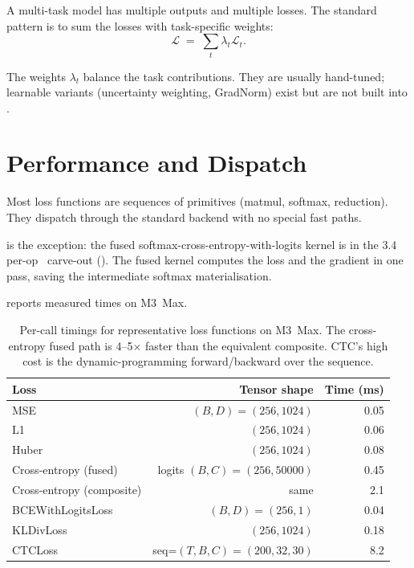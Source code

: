 A multi-task model has multiple outputs and multiple losses.
The standard pattern is to sum the losses with task-specific
weights:
\[
\mathcal{L} \;=\; \sum_t \lambda_t \mathcal{L}_t.
\]

The weights $\lambda_t$ balance the task contributions. They are
usually hand-tuned; learnable variants (uncertainty weighting,
GradNorm) exist but are not built into \Lucid.

\section{Performance and Dispatch}
\label{sec:losses:perf}

Most loss functions are sequences of primitives (matmul, softmax,
reduction). They dispatch through the standard backend with no
special fast paths.

 is the exception: the fused
softmax-cross-entropy-with-logits kernel is in the 3.4 per-op
\MPSGraph\ carve-out
(). The fused kernel computes the
loss and the gradient in one pass, saving the intermediate
softmax materialisation.

 reports measured times on M3~Max.

\begin{table}[t]
\centering
\small
\begin{tabular}{lrr}
\toprule
Loss & Tensor shape & Time (ms) \\
\midrule
MSE                       & $(B, D) = (256, 1024)$ & 0.05 \\
L1                        & $(256, 1024)$          & 0.06 \\
Huber                     & $(256, 1024)$          & 0.08 \\
Cross-entropy (fused)     & logits $(B, C) = (256, 50000)$ & 0.45 \\
Cross-entropy (composite) & same                     & 2.1  \\
BCEWithLogitsLoss         & $(B, D) = (256, 1)$    & 0.04 \\
KLDivLoss                 & $(256, 1024)$          & 0.18 \\
CTCLoss                   & seq=$(T, B, C) = (200, 32, 30)$ & 8.2 \\
\bottomrule
\end{tabular}
\caption[Loss function timings.]{Per-call timings for
representative loss functions on M3~Max. The cross-entropy fused
path is 4--5$\times$ faster than the equivalent composite. CTC's
high cost is the dynamic-programming forward/backward over the
sequence.}
\label{tab:losses:perf}
\end{table}


